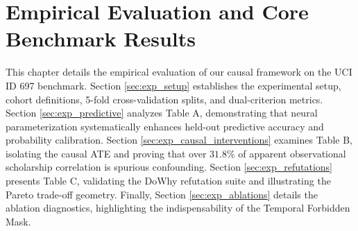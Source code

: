 \chapter{Empirical Evaluation and Core Benchmark Results}
\label{chap:experiments}

This chapter details the empirical evaluation of our causal framework on the UCI ID 697 benchmark. Section \ref{sec:exp_setup} establishes the experimental setup, cohort definitions, 5-fold cross-validation splits, and dual-criterion metrics. Section \ref{sec:exp_predictive} analyzes Table A, demonstrating that neural parameterization systematically enhances held-out predictive accuracy and probability calibration. Section \ref{sec:exp_causal_interventions} examines Table B, isolating the causal ATE and proving that over $31.8\%$ of apparent observational scholarship correlation is spurious confounding. Section \ref{sec:exp_refutations} presents Table C, validating the DoWhy refutation suite and illustrating the Pareto trade-off geometry. Finally, Section \ref{sec:exp_ablations} details the ablation diagnostics, highlighting the indispensability of the Temporal Forbidden Mask.






